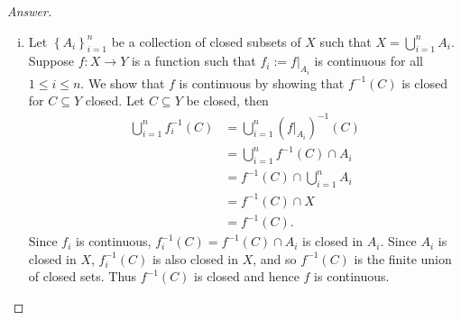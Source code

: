 \documentclass[12pt]{article}
\newcommand\inv[1]{#1^{-1}}
\newcommand\setb[1]{\left \{ #1 \right \}}
\theoremstyle{definition}
\begin{document}
\begin{proof}[Answer]
    \noindent
    \begin{enumerate}[(i)]
        \item Let $\setb{ A_i }_{i = 1}^n$ be a collection of closed subsets of $X$ such that $X = \bigcup\limits_{i = 1}^n A_i$. Suppose $f : X \to Y$ is a function such that $f_i := \left. f \right|_{A_i}$ is continuous for all $1 \leq i \leq n$. We show that $f$ is continuous by showing that $\inv{f}(C)$ is closed for $C \subseteq Y$ closed. Let $C \subseteq Y$ be closed, then 
        \begin{align*}
            \bigcup\limits_{i=1}^n\inv{f_i}(C)&=\bigcup\limits_{i=1}^{n}\inv{\left(\left.f\right|_{A_i}\right)}(C)\\
            &=\bigcup\limits_{i=1}^n\inv{f}(C)\cap A_i\\
            &=\inv{f}(C)\cap\bigcup\limits_{i=1}^nA_i\\
            &=\inv{f}(C)\cap X\\
            &=\inv{f}(C).
        \end{align*}
        Since $f_i$ is continuous, $\inv{f_i}(C) = \inv{f}(C) \cap A_i$ is closed in $A_i$. Since $A_i$ is closed in $X$, $\inv{f_i}(C)$ is also closed in $X$, and so $\inv{f}(C)$ is the finite union of closed sets. Thus $\inv{f}(C)$ is closed and hence $f$ is continuous.
        

\end{enumerate}
\end{proof}
\end{document}
